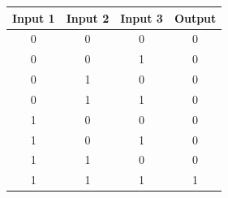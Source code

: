 \begin{figure}[H]
  \begin{subfigure}[t]{.49\columnwidth}
    \begin{tabular}[b]{cccc}
      \hline
    \multicolumn{1}{l}{\textbf{Input 1}} & \multicolumn{1}{l}{\textbf{Input 2}} & \multicolumn{1}{l}{\textbf{Input 3}} & \multicolumn{1}{l}{\textbf{Output}} \\
    \hline
    0 & 0                                    & 0                                    & 0                                   \\
    0 & 0                                    & 1                                    & 0                                   \\
    0 & 1                                    & 0                                    & 0                                   \\
    0 & 1                                    & 1                                    & 0                                   \\
    1 & 0                                    & 0                                    & 0                                   \\
    1 & 0                                    & 1                                    & 0                                   \\
    1 & 1                                    & 0                                    & 0                                   \\
    1 & 1                                    & 1                                    & 1                                   \\


\end{tabular}
\end{subfigure}
\end{figure}
